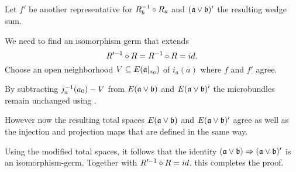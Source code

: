\begin{myproof}
\begin{enumerate}
        Let $f'$ be another representative for $R_b^{-1} \circ R_a$ and $(\mathfrak{a} \vee \mathfrak{b})'$ the resulting wedge sum.
        
        We need to find an isomorphism germ that extends
        \[ R'^{-1} \circ R = R^{-1} \circ R = id. \]
        Choose an open neighborhood $V \subseteq{} E(\mathfrak{a}\vert_{a_0})$ of $i_a(a)$ where $f$ and $f'$ agree.
        
        By subtracting $j_a^{-1}(a_0) - V$ from $E(\mathfrak{a} \vee \mathfrak{b})$ and $E(\mathfrak{a} \vee \mathfrak{b})'$
        the microbundles remain unchanged using .
        
        However now the resulting total spaces $E(\mathfrak{a} \vee \mathfrak{b})$ and $E(\mathfrak{a} \vee \mathfrak{b})'$ agree
        as well as the injection and projection maps that are defined in the same way.
        
        Using the modified total spaces,
        it follows that the identity $(\mathfrak{a} \vee \mathfrak{b}) \Rightarrow{} (\mathfrak{a} \vee \mathfrak{b})'$
        is an isomorphism-germ.
        Together with $R'^{-1} \circ R = id$, this completes the proof.
    \end{enumerate}
\end{myproof}